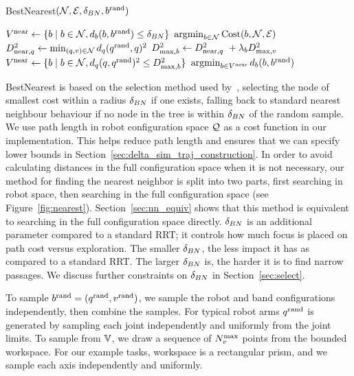 \begin{algorithm}[h]
\caption{BestNearest$(\mathcal{N}, \mathcal{E}, \delta_{BN}, b^\textrm{rand})$}
\begin{algorithmic}[1]
    \State $V^{\textrm{near}} \gets \{ b \mid b \in \mathcal{N}, d_b(b, b^\textrm{rand}) \leq \delta_{BN} \}$
    \If {$\Pstatenear \neq \emptyset$}
        \State \Return $\operatorname*{argmin}_{b \in \mathcal{N}} \textrm{Cost}(b, \mathcal{N}, \mathcal{E})$
    \Else
        \State $D_{\textrm{near},q}^2 \gets \min_{(q, v) \in \mathcal{N}}{d_q(q^\textrm{rand}, q)^2}$ \label{alg:nearst:robotspace}
        \State $D_{\textrm{max},b}^2 \gets D_{\textrm{near},q}^2\ + \lambda_b D_{\textrm{max},v}^2$
        \State $V^{\textrm{near}} \gets \{ b \mid b \in \mathcal{N}, d_q(q, q^\textrm{rand})^2 \leq D_{\textrm{max},b}^2 \}$ \label{alg:nearest:radius}
        \State \Return $\operatorname*{argmin}_{b \in V^{\textrm{near}}}{d_b(b, b^\textrm{rand})}$ \label{alg:nearest:fullspace}
    \EndIf
\end{algorithmic}
\label{alg:nearest}
\end{algorithm}

BestNearest is based on the selection method used by~\cite{LiAOKP2016}, selecting the node of smallest cost within a radius $\delta_{BN}$ if one exists, falling back to standard nearest neighbour behaviour if no node in the tree is within $\delta_{BN}$ of the random sample. We use path length in robot configuration space $\mathcal{Q}$ as a cost function in our implementation. This helps reduce path length and ensures that we can specify lower bounds in Section~\ref{sec:delta_sim_traj_construction}. In order to avoid calculating distances in the full configuration space when it is not necessary, our method for finding the nearest neighbor is split into two parts, first searching in robot space, then searching in the full configuration space (see Figure~\ref{fig:nearest}). Section~\ref{sec:nn_equiv} shows that this method is equivalent to searching in the full configuration space directly. $\delta_{BN}$ is an additional parameter compared to a standard RRT; it controls how much focus is placed on path cost versus exploration. The smaller $\delta_{BN}$, the less impact it has as compared to a standard RRT.  The larger $\delta_{BN}$ is, the harder it is to find narrow passages. We discuss further constraints on $\delta_{BN}$ in Section~\ref{sec:select}.

To sample $b^\textrm{rand} = ( q^\textrm{rand}, v^\textrm{rand} )$, we sample the robot and band configurations independently, then combine the samples. For typical robot arms $q^\textrm{rand}$ is generated by sampling each joint independently and uniformly from the joint limits. To sample from $\mathbb{V}$, we draw a sequence of $N_v^\textrm{max}$ points from the bounded workspace. For our example tasks, workspace is a rectangular prism, and we sample each axis independently and uniformly.


